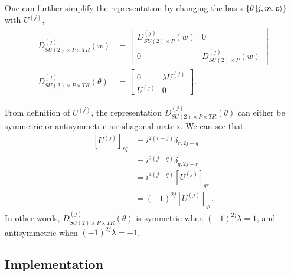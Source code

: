 \documentclass[preprint, 12pt]{revtex4-2}
\numberwithin{equation}{section}
\begin{document}
One can further simplify the representation by changing the basis $\{\theta\ket{j, m, p}\}$ with $U^{(j)}$,
\begin{equation}
    \begin{aligned}
        D_{SU(2)\times P\times TR}^{(j)}(w) &= 
        \begin{bmatrix}
            D^{(j)}_{SU(2)\times P}(w) & 0 \\
            0 & D^{(j)}_{SU(2)\times P}(w)
        \end{bmatrix} \\
        D_{SU(2)\times P\times TR}^{(j)}(\theta) &= 
        \begin{bmatrix}
            0 & \lambda U^{(j)} \\
            U^{(j)} & 0
        \end{bmatrix}.
    \end{aligned}
\end{equation}

From definition of $U^{(j)}$, the representation $D_{SU(2)\times P\times TR}^{(j)}(\theta)$ can either be symmetric or antisymmetric antidiagonal matrix. We can see that
\begin{equation}
    \begin{aligned}
        \left[U^{(j)}\right]_{rq} &= i^{2(r-j)}\delta_{r,2j-q} \\
        &= i^{2(j-q)}\delta_{q,2j-r} \\
        &= i^{4(j-q)}\left[U^{(j)}\right]_{qr} \\
        &= (-1)^{2j}\left[U^{(j)}\right]_{qr}.
    \end{aligned}
\end{equation}
In other words, $D_{SU(2)\times P\times TR}^{(j)}(\theta)$ is symmetric when $(-1)^{2j}\lambda = 1$, and antisymmetric when $(-1)^{2j}\lambda = -1$. 

\subsection{Implementation}
\end{document}
